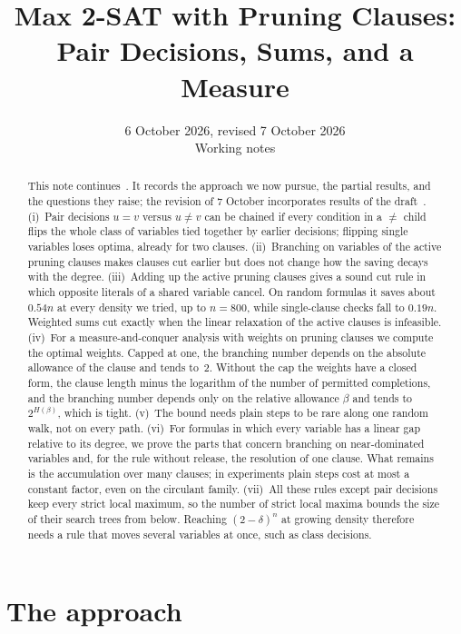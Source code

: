 \documentclass[11pt,a4paper]{article}
\title{Max 2-SAT with Pruning Clauses:\\ Pair Decisions, Sums, and a Measure}
\author{}
\date{6 October 2026, revised 7 October 2026\\[3pt]\small Working notes}
\theoremstyle{remark}
\begin{document}
\maketitle

\begin{abstract}
This note continues~\cite{N3}. It records the approach we now pursue, the
partial results, and the questions they raise; the revision of 7 October
incorporates results of the draft~\cite{N5}.
(i)~Pair decisions $u=v$ versus $u\ne v$ can be chained if every condition in
a $\ne$ child flips the whole class of variables tied together by earlier
decisions; flipping single variables loses optima, already for two clauses.
(ii)~Branching on variables of the active pruning clauses makes clauses cut
earlier but does not change how the saving decays with the degree.
(iii)~Adding up the active pruning clauses gives a sound cut rule in which
opposite literals of a shared variable cancel. On random formulas it saves
about $0.54n$ at every density we tried, up to $n=800$, while single-clause
checks fall to $0.19n$. Weighted sums cut exactly when the linear relaxation of
the active clauses is infeasible.
(iv)~For a measure-and-conquer analysis with weights on pruning clauses we
compute the optimal weights. Capped at one, the branching number depends on
the absolute allowance of the clause and tends to~$2$. Without the cap the
weights have a closed form, the clause length minus the logarithm of the number
of permitted completions, and the branching number depends only on the relative
allowance $\beta$ and tends to $2^{H(\beta)}$, which is tight.
(v)~The bound needs plain steps to be rare along one random walk, not on every
path.
(vi)~For formulas in which every variable has a linear gap relative to its
degree, we prove the parts that concern branching on near-dominated variables
and, for the rule without release, the resolution of one clause. What remains
is the accumulation over many clauses; in experiments plain steps cost at most a
constant factor, even on the circulant family.
(vii)~All these rules except pair decisions keep every strict local maximum, so
the number of strict local maxima bounds the size of their search trees from
below. Reaching $(2-\delta)^n$ at growing density therefore needs a rule that
moves several variables at once, such as class decisions.
\end{abstract}

\section{The approach}\label{sec:approach}
\end{document}
